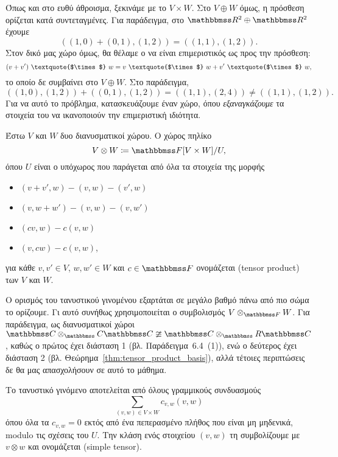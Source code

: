 \documentclass[12pt,a4paper,reqno]{amsart}
\newcommand{\defn}[1]{{\color{mylightblue}{#1}}}
\begin{document}
Όπως και στο ευθύ άθροισμα, ξεκινάμε με το $V\times{W}$. Στο $V \oplus W$ όμως, η πρόσθεση ορίζεται κατά συντεταγμένες. Για παράδειγμα, στο $\RR^2 \oplus \RR^2$ έχουμε 
\[
((1,0) + (0,1), (1,2)) = ((1,1), (1,2)).
\]
Στον δικό μας χώρο όμως, θα θέλαμε ο  να είναι επιμεριστικός ως προς την πρόσθεση:
\[
(v + v') \ \text{\textquote{$\times$}} \ w = 
v \ \text{\textquote{$\times$}} \ w + v' \ \text{\textquote{$\times$}} \ w,
\]
το οποίο δε συμβαίνει στο $V\oplus W$. Στο παράδειγμα, 
\[
((1,0), (1,2)) + ((0,1),(1,2)) = ((1,1), (2,4)) \neq ((1,1), (1,2)).
\] 
Για να  αυτό το πρόβλημα, κατασκευάζουμε έναν χώρο, όπου \emph{εξαναγκάζουμε} τα στοιχεία του να ικανοποιούν την επιμεριστική ιδιότητα.

\begin{definition}
    \label{def:tensor_product}
    Έστω $V$ και $W$ δυο διανυσματικοί χώρου. Ο χώρος πηλίκο
    \[
    V \otimes W \coloneqq \FF[V \times W] / U,
    \]
    όπου $U$ είναι ο υπόχωρος που παράγεται από όλα τα στοιχεία της μορφής 
    \begin{itemize}
        \item $(v + v', w) - (v,w) - (v',w)$
        \item $(v, w+w') - (v,w) - (v,w')$
        \item $(cv, w) - c(v,w)$
        \item $(v, cw) - c(v,w)$,
    \end{itemize}
    για κάθε $v, v' \in V$, $w, w' \in W$ και $c \in \FF$ ονομάζεται \defn{τανυστικό γινόμενο} (tensor product) των $V$ και $W$.
\end{definition}

\begin{remark}
    Ο ορισμός του τανυστικού γινομένου εξαρτάται σε μεγάλο βαθμό πάνω από πιο σώμα το ορίζουμε. Γι αυτό συνήθως χρησιμοποιείται ο συμβολισμός $V\otimes_{\FF}W$. Για παράδειγμα, ως διανυσματικοί χώροι $\CC\otimes_\CC\CC \ncong \CC\otimes_\RR\CC$, καθώς ο πρώτος έχει διάσταση 1 (βλ. Παράδειγμα~6.4~(1)), ενώ ο δεύτερος έχει διάσταση 2 (βλ. Θεώρημα~\ref{thm:tensor_product_basis}), αλλά τέτοιες περιπτώσεις δε θα μας απασχολήσουν σε αυτό το μάθημα.
\end{remark}

Το τανυστικό γινόμενο αποτελείται από όλους γραμμικούς συνδυασμούς 
\[
\sum_{(v,w) \in V\times W} c_{v,w}(v,w)
\]
όπου όλα τα $c_{v,w}=0$ εκτός από ένα πεπερασμένο πλήθος που είναι μη μηδενικά, modulo τις σχέσεις του $U$. Την κλάση ενός στοιχείου $(v,w)$ τη συμβολίζουμε με $v \otimes w$ και ονομάζεται \defn{στοιχειώδης τανυστής} (simple tensor).
\end{document}
